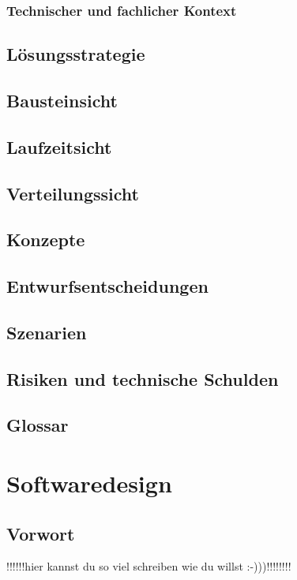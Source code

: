 \documentclass[12pt,a4paper,bibliography=totocnumbered,listof=totocnumbered]{scrartcl}
\begin{document}
\subsubsection{Technischer und fachlicher Kontext}

\subsection{Lösungsstrategie}

\subsection{Bausteinsicht}

\subsection{Laufzeitsicht}

\subsection{Verteilungssicht}

\subsection{Konzepte}
\subsection{Entwurfsentscheidungen}

\subsection{Szenarien}

\subsection{Risiken und technische Schulden}

\subsection{Glossar}

\newpage
\section{Softwaredesign}
\sloppy
\subsection{Vorwort}
!!!!!!hier kannst du so viel schreiben wie du willst :-)))!!!!!!!!
\end{document}
